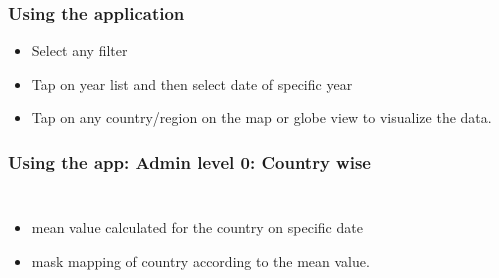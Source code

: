 \begin{frame}
\frametitle{Using the application}
\begin{itemize}
    \item Select any filter
    \item Tap on year list and then select date of specific year
    \item Tap on any country/region on the map or globe view to visualize the data.
\end{itemize}
\end{frame}

\begin{frame}
\frametitle{Using the app: Admin level 0: Country wise}
\begin{columns}

 \begin{itemize}
       \item mean value calculated for the country on specific date
       \item mask mapping of country according to the mean value.
   \end{itemize}


\end{columns}
\end{frame}
